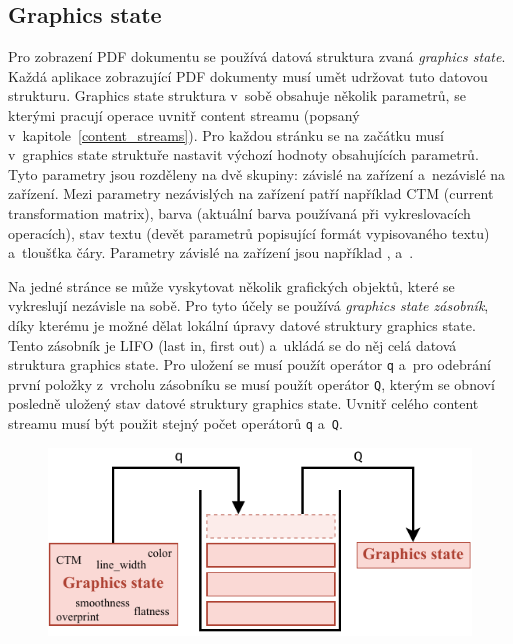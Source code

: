 \subsection*{Graphics state} \label{graphics_state}
Pro zobrazení PDF dokumentu se používá datová struktura zvaná \emph{graphics state}.
Každá aplikace zobrazující PDF dokumenty musí umět udržovat tuto datovou strukturu.
Graphics state struktura v~sobě obsahuje několik parametrů, se kterými pracují
operace uvnitř content streamu (popsaný v~kapitole~\ref{content_streams}). Pro
každou stránku se na začátku musí v~graphics state struktuře nastavit výchozí
hodnoty obsahujících parametrů. Tyto parametry jsou rozděleny na dvě skupiny:
závislé na zařízení a~nezávislé na zařízení. Mezi parametry nezávislých na zařízení
patří například CTM (current transformation matrix), barva (aktuální barva
používaná při vykreslovacích operacích), stav textu (devět parametrů popisující
formát vypisovaného textu) a~tloušťka čáry. Parametry závislé na zařízení jsou
například ,  a~.

Na jedné stránce se může vyskytovat několik grafických objektů, které se
vykreslují nezávisle na sobě. Pro tyto účely se používá
\emph{graphics state zásobník}, díky kterému je možné dělat lokální úpravy 
datové struktury graphics state. Tento zásobník je LIFO (last in, first out)
a~ukládá se do něj celá datová struktura graphics state. Pro uložení
se musí použít operátor \texttt{q} a~pro odebrání první položky z~vrcholu
zásobníku se musí použít operátor \texttt{Q}, kterým se obnoví posledně uložený
stav datové struktury graphics state. Uvnitř celého content streamu musí být
použit stejný počet operátorů \texttt{q} a~\texttt{Q}.

\begin{figure}[H]
    \label{pic_graphics_state}
    \centering
    \includegraphics[width=0.7\linewidth]{obrazky-figures/graphics_state_stack.pdf}
    \caption{}
\end{figure}

